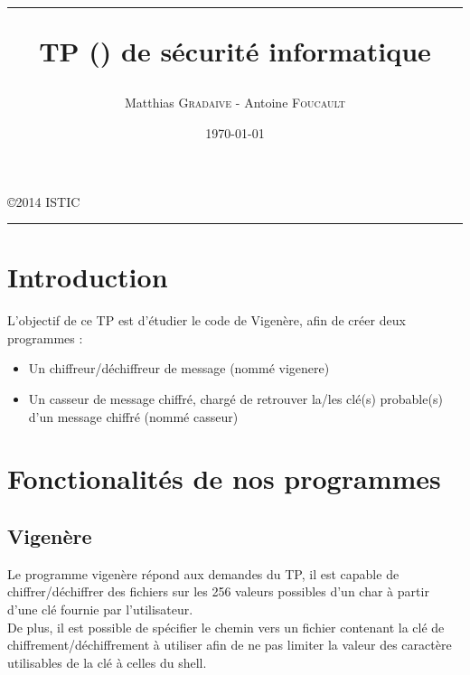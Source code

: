 \documentclass[a4paper, 11pt, oneside]{article}
\title{\hrule \vspace{1cm} TP (\no1) de sécurité informatique}
\author{Matthias \textsc{Gradaive} - Antoine \textsc{Foucault}}
\date{\today}
\begin{document}
\pagestyle{fancy}
\lhead{}
\chead{}
\rhead{\leftmark}
\cfoot{}

\clearpage
\thispagestyle{empty}

\maketitle
\begin{center}
 \copyright 2014 ISTIC\\
\end{center}
\vspace{1cm}
\hrule
\thispagestyle{empty}

\newpage

\renewcommand{\contentsname}{Sommaire}
\tableofcontents
\thispagestyle{empty}
\newpage
\setcounter{page}{1}

\section*{Introduction}

L'objectif de ce TP est d'étudier le code de Vigenère, afin de créer deux programmes :\\

\begin{itemize}
 \item Un chiffreur/déchiffreur de message (nommé vigenere)
 \item Un casseur de message chiffré, chargé de retrouver la/les clé(s) probable(s) d'un message chiffré (nommé casseur)
\end{itemize}

\section{Fonctionalités de nos programmes}

\subsection{Vigenère}

Le programme vigenère répond aux demandes du TP, il est capable de chiffrer/déchiffrer des fichiers sur les 256 valeurs possibles d'un char à partir d'une clé fournie par l'utilisateur.\\
De plus, il est possible de spécifier le chemin vers un fichier contenant la clé de chiffrement/déchiffrement à utiliser afin de ne pas limiter la valeur des caractère utilisables de la clé à celles du shell.
\end{document}
